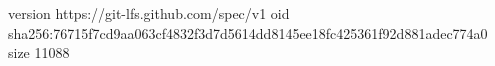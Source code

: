 version https://git-lfs.github.com/spec/v1
oid sha256:76715f7cd9aa063cf4832f3d7d5614dd8145ee18fc425361f92d881adec774a0
size 11088
